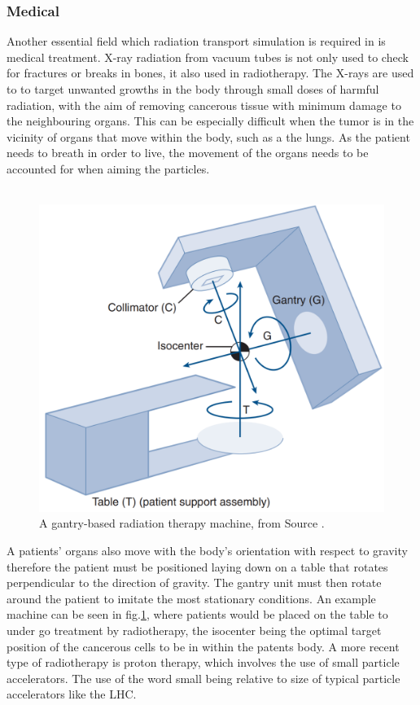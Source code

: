 \documentclass[12pt,a4paper]{article}
\begin{document}
\subsubsection{Medical}
\noindent Another essential field which radiation transport simulation is required in is medical treatment. X-ray radiation from vacuum tubes is not only used to check for fractures or breaks in bones, it also used in radiotherapy. The X-rays are used to to target unwanted growths in the body through small doses of harmful radiation, with the aim of removing cancerous tissue with minimum damage to the neighbouring organs. This can be especially difficult when the tumor is in the vicinity of organs that move within the body, such as a the lungs. As the patient needs to breath in order to live, the movement of the organs needs to be accounted for when aiming the particles.
\\\\
\begin{figure}[h!]
\centering
\includegraphics[scale=0.35]{Images//introduction//radiotherapy.png}
\caption[width=\columnwidth]{A gantry-based radiation therapy machine, from Source \cite{cancer}.}
\label{cancer}
\end{figure}

\noindent A patients' organs also move with the body's orientation with respect to gravity therefore the patient must be positioned laying down on a table that rotates perpendicular to the direction of gravity. The gantry unit must then rotate around the patient to imitate the most stationary conditions. An example machine can be seen in fig.\ref{cancer}, where patients would be placed on the table to under go treatment by radiotherapy, the isocenter being the optimal target position of the cancerous cells to be in within the patents body.  A more recent type of radiotherapy is proton therapy, which involves the use of small particle accelerators. The use of the word small being relative to size of typical particle accelerators like the LHC.
\end{document}
